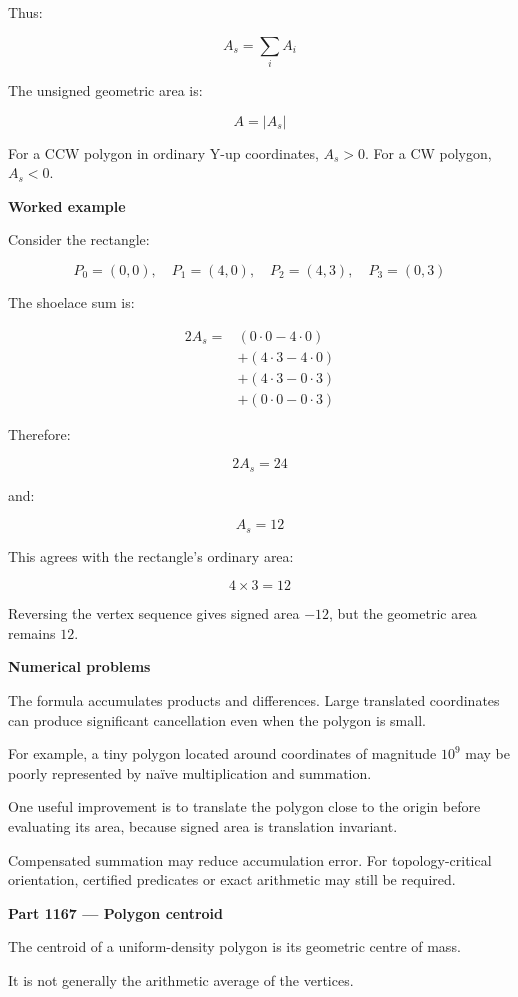 Thus:

\[
A_s=\sum_i A_i
\]

The unsigned geometric area is:

\[
\boxed{A=|A_s|}
\]

For a CCW polygon in ordinary Y-up coordinates, \(A_s>0\). For a CW polygon, \(A_s<0\).

\textbf{Worked example}

Consider the rectangle:

\[
P_0=(0,0),\quad P_1=(4,0),\quad P_2=(4,3),\quad P_3=(0,3)
\]

The shoelace sum is:

\[
\begin{aligned} 2A_s={}&(0\cdot0-4\cdot0)\\\ &+(4\cdot3-4\cdot0)\\\ &+(4\cdot3-0\cdot3)\\\ &+(0\cdot0-0\cdot3) \end{aligned}
\]

Therefore:

\[
2A_s=24
\]

and:

\[
\boxed{A_s=12}
\]

This agrees with the rectangle's ordinary area:

\[
4\times3=12
\]

Reversing the vertex sequence gives signed area \(-12\), but the geometric area remains \(12\).

\textbf{Numerical problems}

The formula accumulates products and differences. Large translated coordinates can produce significant cancellation even when the polygon is small.

For example, a tiny polygon located around coordinates of magnitude \(10^9\) may be poorly represented by naïve multiplication and summation.

One useful improvement is to translate the polygon close to the origin before evaluating its area, because signed area is translation invariant.

Compensated summation may reduce accumulation error. For topology-critical orientation, certified predicates or exact arithmetic may still be required.

\textbf{Part 1167 --- Polygon centroid}

The centroid of a uniform-density polygon is its geometric centre of mass.

It is not generally the arithmetic average of the vertices.

